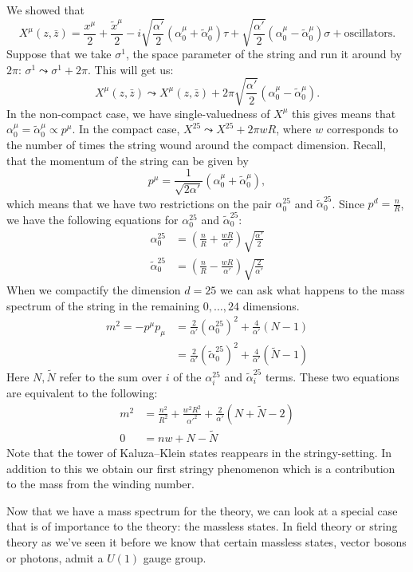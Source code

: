 \documentclass{report}
\theoremstyle{plain}
\theoremstyle{definition}
\theoremstyle{remark}
\newcommand{\FR}[2]{\frac{#1}{#2}}
\newcommand{\SFR}[2]{\sqrt{\frac{#1}{#2}}}
\newcommand{\sg}{\sigma}
\begin{document}
We showed that \[X^\mu(z,\bar z) = \FR{x^\mu}{2} + \FR{\tilde x^\mu}{2}
-i\SFR{\alpha'}{2}(\alpha_0^\mu + \tilde \alpha_0^\mu)\tau
+ \SFR{\alpha'}{2}(\alpha_0^\mu - \tilde \alpha_0^\mu)\sg
+ \text{oscillators}.\]
Suppose that we take $\sg^1$, the space parameter of the string and run it
around by $2\pi$: $\sg^1 \leadsto \sg^1+2\pi$. This will get us:
\[X^\mu(z,\bar z) \leadsto X^\mu(z,\bar
z)+2\pi\SFR{\alpha'}{2}(\alpha_0^\mu - \tilde\alpha_0^\mu).\]
In the non-compact case, we have single-valuedness of $X^\mu$ this gives
means that $\alpha_0^\mu = \tilde\alpha_0^\mu\propto p^\mu$. In the compact
case, $X^{25} \leadsto X^{25} + 2\pi wR$, where $w$ corresponds to the number
of times the string wound around the compact dimension.  Recall, that the
momentum of the string can be given by \[p^\mu = \FR{1}{\sqrt{2\alpha'}}
(\alpha_0^\mu+\tilde\alpha_0^\mu),\] which means that we have two
restrictions on the pair $\alpha_0^{25}$ and $\tilde\alpha_0^{25}$. Since
$p^d = \FR{n}{R}$, we have the following equations for $\alpha_0^{25}$ and
$\tilde\alpha_0^{25}$:
\begin{align*}
    \alpha_0^{25} &= \left( \FR{n}{R}+\FR{wR}{\alpha'} \right)
    \SFR{\alpha'}{2}\\
    \tilde\alpha_0^{25}&= \left( \FR{n}{R}-\FR{wR}{\alpha'} \right)
    \SFR{2}{\alpha'}
\end{align*}
When we compactify the dimension $d=25$ we can ask what happens to the
mass spectrum of the string in the remaining $0,\dots,24$ dimensions.
\begin{align}
    m^2 = -p^\mu p_\mu 
&= \FR{2}{\alpha'}(\alpha_0^{25})^2 + \FR{4}{\alpha'}(N-1)\\
&= \FR{2}{\alpha'}(\tilde\alpha_0^{25})^2 + \FR{4}{\alpha'}(\tilde N-1)
\label{mass-spectrum-compactification}
\end{align}
Here $N,\tilde N$ refer to the sum over $i$ of the $\alpha_i^{25}$ and
$\tilde\alpha_i^{25}$ terms. These two equations are equivalent to the
following:
\begin{align}
    m^2 &= \FR{n^2}{R^2} + \FR{w^2R^2}{\alpha'^2} + \FR{2}{\alpha'}(N +
    \tilde N - 2)\\
    0&= nw + N-\tilde N
    \label{massspectrum-tduality}
\end{align}
Note that the tower of Kaluza--Klein states reappears in the
stringy-setting. In addition to this we obtain our first stringy phenomenon
which is a contribution to the mass from the winding number.

Now that we have a mass spectrum for the theory, we can look at a
special case that is of importance to the theory: the massless states.
In field theory or string theory as we've seen it before we know that
certain massless states, vector bosons or photons, admit a $U(1)$
gauge group. 
\end{document}
